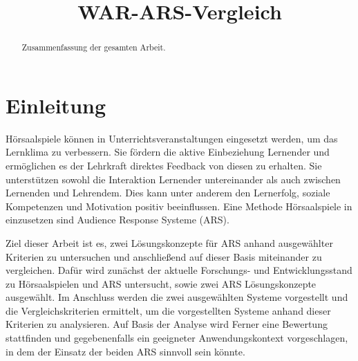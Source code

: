 \documentclass[conference]{IEEEtran}
\begin{document}
\title{WAR-ARS-Vergleich}

\author{
}

\maketitle

\begin{abstract}
Zusammenfassung der gesamten Arbeit.
\end{abstract}


\section{Einleitung}
Hörsaalspiele können in Unterrichtsveranstaltungen eingesetzt werden, um das Lernklima zu verbessern. Sie fördern die aktive Einbeziehung Lernender und ermöglichen es der Lehrkraft direktes Feedback von diesen zu erhalten. Sie unterstützen sowohl die Interaktion Lernender untereinander als auch zwischen Lernenden und Lehrendem. Dies kann unter anderem den Lernerfolg, soziale Kompetenzen und Motivation positiv beeinflussen. \cite[p. 368]{Lehmann2014} Eine Methode Hörsaalspiele in einzusetzen sind Audience Response Systeme (ARS). 

Ziel dieser Arbeit ist es, zwei Lösungskonzepte für ARS anhand ausgewählter Kriterien zu untersuchen und anschließend auf dieser Basis miteinander zu vergleichen. Dafür wird zunächst der aktuelle Forschungs- und Entwicklungsstand zu Hörsaalspielen und ARS untersucht, sowie zwei ARS Lösungskonzepte ausgewählt. Im Anschluss werden die zwei ausgewählten Systeme vorgestellt und die Vergleichskriterien ermittelt, um die vorgestellten Systeme anhand dieser Kriterien zu analysieren. 
Auf Basis der Analyse wird Ferner eine Bewertung stattfinden und gegebenenfalls ein geeigneter Anwendungskontext vorgeschlagen, in dem der Einsatz der beiden ARS sinnvoll sein könnte.
\end{document}
